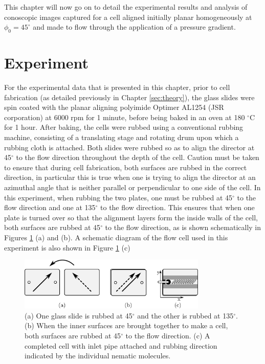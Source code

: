 This chapter will now go on to detail the experimental results and analysis of conoscopic images captured for a cell aligned initially planar homogeneously at $\phi_0=45^{\circ}$ and made to flow through the application of a pressure gradient.

\section{Experiment}
\label{sec:45_experiment}
For the experimental data that is presented in this chapter, prior to cell fabrication (as detailed previously in Chapter \ref{sec:theory}), the glass slides were spin coated with the planar aligning polyimide Optimer AL1254 (JSR corporation) at 6000 rpm for 1 minute, before being baked in an oven at 180 $^{\circ}$C for 1 hour. After baking, the cells were rubbed using a conventional rubbing machine, consisting of a translating stage and rotating drum upon which a rubbing cloth is attached. Both slides were rubbed so as to align the director at 45$^{\circ}$ to the flow direction throughout the depth of the cell. Caution must be taken to ensure that during cell fabrication, both surfaces are rubbed in the correct direction, in particular this is true when one is trying to align the director at an azimuthal angle that is neither parallel or perpendicular to one side of the cell. In this experiment, when rubbing the two plates, one must be rubbed at 45$^{\circ}$ to the flow direction and one at 135$^{\circ}$ to the flow direction. This ensures that when one plate is turned over so that the alignment layers form the inside walls of the cell, both surfaces are rubbed at 45$^{\circ}$ to the flow direction, as is shown schematically in Figures \ref{fig:rubbing} (a) and (b). A schematic diagram of the flow cell used in this experiment is also shown in Figure \ref{fig:rubbing} (c)

\begin{figure}
\begin{center}
\includegraphics[width=0.8\textwidth]{Figures/45/rubbing}
\end{center}
\caption[Rubbing directions for $\phi_0=45^{\circ}$]{\label{fig:rubbing}(a) One glass slide is rubbed at 45$^{\circ}$ and the other is rubbed at 135$^{\circ}$. (b) When the inner surfaces are brought together to make a cell, both surfaces are rubbed at 45$^{\circ}$ to the flow direction. (c) A completed cell with inlet pipe attached and rubbing direction indicated by the individual nematic molecules.}
\end{figure}

